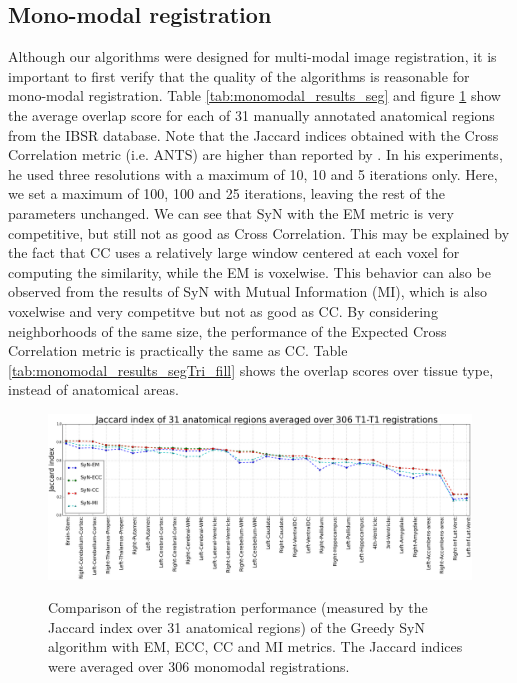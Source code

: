 \subsection{Mono-modal registration}
Although our algorithms were designed for multi-modal image registration, it is important to first verify that the quality of the algorithms is reasonable for mono-modal registration.
Table \ref{tab:monomodal_results_seg} and figure \ref{fig:mono_graph_seg} show the average overlap score for each of 31 manually annotated anatomical regions from the IBSR database.
Note that the Jaccard indices obtained with the Cross Correlation metric (i.e. ANTS) are higher than reported by \cite{Rohlfing2012}. In his experiments, he used
three resolutions with a maximum of 10, 10 and 5 iterations only. Here, we set a maximum of 100, 100 and 25 iterations, leaving the rest of the parameters
unchanged. We can see that SyN with the EM metric is very competitive, but still not as good as Cross Correlation. This may be explained by the fact that CC uses a relatively large
window centered at each voxel for computing the similarity, while the EM is voxelwise. This behavior can also be observed from the results of SyN with Mutual Information (MI), which is also
voxelwise and very competitve but not as good as CC. By considering neighborhoods of the same size, the performance of the Expected Cross Correlation metric is practically the
same as CC. Table \ref{tab:monomodal_results_segTri_fill} shows the overlap scores over tissue type, instead of anatomical areas.




\begin{figure}[H]
\centering
\includegraphics[width=1.0\linewidth]{./images/mono_lines_seg.png}\\
\caption{Comparison of the registration performance (measured by the Jaccard index over 31 anatomical regions) of the Greedy SyN algorithm with EM, ECC, CC and MI metrics. The Jaccard
indices were averaged over 306 monomodal registrations.}
\label{fig:mono_graph_seg}
\end{figure}

